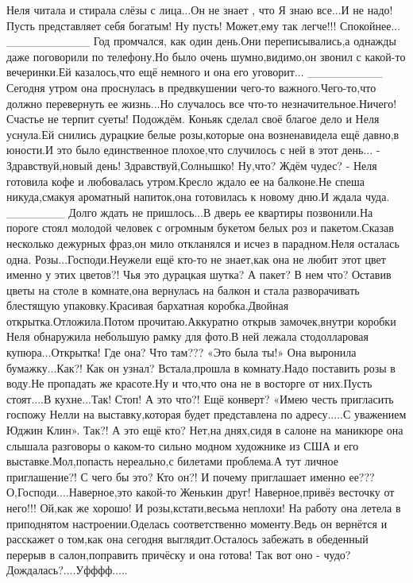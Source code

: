 Неля читала и стирала слёзы с лица...Он не знает , что Я знаю все...И не надо! Пусть представляет себя богатым! Ну пусть! Может,ему так легче!!! Спокойнее...
__________
Год промчался, как один день.Они переписывались,а однажды даже поговорили по телефону.Но было очень шумно,видимо,он звонил с какой-то вечеринки.Ей казалось,что ещё немного и она его уговорит...
_________
Сегодня утром она проснулась в предвкушении чего-то важного.Чего-то,что должно перевернуть ее жизнь...Но случалось все что-то незначительное.Ничего! Счастье не терпит суеты! Подождём.
Коньяк сделал своё благое дело и Неля уснула.Ей снились дурацкие белые розы,которые она возненавидела ещё давно,в юности.И это было единственное плохое,что случилось с ней в этот день...
- Здравствуй,новый день! Здравствуй,Солнышко! Ну,что? Ждём чудес? - Неля готовила кофе и любовалась утром.Кресло ждало ее на балконе.Не спеша никуда,смакуя ароматный напиток,она готовилась к новому дню.И ждала чуда.
_______
Долго ждать не пришлось...В дверь ее квартиры позвонили.На пороге стоял молодой человек с огромным букетом белых роз и пакетом.Сказав несколько дежурных фраз,он мило откланялся и исчез в парадном.Неля осталась одна.
Розы...Господи.Неужели ещё кто-то не знает,как она не любит этот цвет именно у этих цветов?! Чья это дурацкая шутка? А пакет? В нем что? 
Оставив цветы на столе в комнате,она вернулась на балкон и стала разворачивать блестящую упаковку.Красивая бархатная коробка.Двойная открытка.Отложила.Потом прочитаю.Аккуратно открыв замочек,внутри коробки Неля обнаружила небольшую рамку для фото.В ней лежала стодолларовая купюра...Открытка! Где она? Что там??? «Это была ты!» 
Она выронила бумажку...Как?! Как он узнал? 
Встала,прошла в комнату.Надо поставить розы в воду.Не пропадать же красоте.Ну и что,что она не в восторге от них.Пусть стоят....В кухне...Так! Стоп! А это что?! Ещё конверт? 
«Имею честь пригласить госпожу Нелли на выставку,которая будет представлена по адресу.....С уважением Юджин Клин». Так?! А это ещё кто? Нет,на днях,сидя в салоне на маникюре она слышала разговоры о каком-то сильно модном художнике из США и его выставке.Мол,попасть нереально,с билетами проблема.А тут личное приглашение?! С чего бы это? Кто он?! И почему приглашает именно ее??? О,Господи....Наверное,это какой-то Женькин друг! Наверное,привёз весточку от него!!! Ой,как же хорошо! И розы,кстати,весьма неплохи!
На работу она летела в приподнятом настроении.Оделась соответственно моменту.Ведь он вернётся и расскажет о том,как она сегодня выглядит.Осталось забежать в обеденный перерыв в салон,поправить причёску и она готова! Так вот оно - чудо? Дождалась?....Уфффф.....
